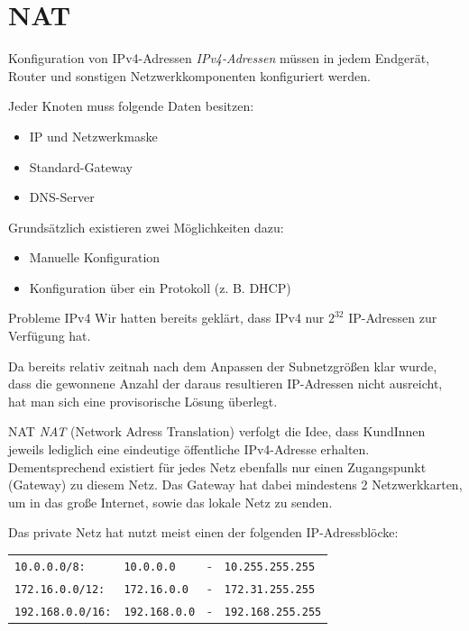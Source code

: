\section{NAT}

\begin{bonus}{Konfiguration von IPv4-Adressen}
    \emph{IPv4-Adressen} müssen in jedem Endgerät, Router und sonstigen Netzwerkkomponenten konfiguriert werden.

    Jeder Knoten muss folgende Daten besitzen:
    \begin{itemize}
        \item IP und Netzwerkmaske
        \item Standard-Gateway
        \item DNS-Server
    \end{itemize}

    Grundsätzlich existieren zwei Möglichkeiten dazu:
    \begin{itemize}
        \item Manuelle Konfiguration
        \item Konfiguration über ein Protokoll (z. B. DHCP)
    \end{itemize}
\end{bonus}

\begin{bonus}{Probleme IPv4}
    Wir hatten bereits geklärt, dass IPv4 nur $2^{32}$ IP-Adressen zur Verfügung hat.

    Da bereits relativ zeitnah nach dem Anpassen der Subnetzgrößen klar wurde, dass die gewonnene Anzahl der daraus resultieren IP-Adressen nicht ausreicht, hat man sich eine provisorische Lösung überlegt.
\end{bonus}

\begin{defi}{NAT}
    \emph{NAT} (Network Adress Translation) verfolgt die Idee, dass KundInnen jeweils lediglich eine eindeutige öffentliche IPv4-Adresse erhalten.
    Dementsprechend existiert für jedes Netz ebenfalls nur einen Zugangspunkt (Gateway) zu diesem Netz.
    Das Gateway hat dabei mindestens 2 Netzwerkkarten, um in das große Internet, sowie das lokale Netz zu senden.

    Das private Netz hat nutzt meist einen der folgenden IP-Adressblöcke:\\
    \begin{tabular}{llcl}
        \texttt{10.0.0.0/8:}     & \texttt{10.0.0.0}    & - & \texttt{10.255.255.255}  \\
        \texttt{172.16.0.0/12:}  & \texttt{172.16.0.0}  & - & \texttt{172.31.255.255}  \\
        \texttt{192.168.0.0/16:} & \texttt{192.168.0.0} & - & \texttt{192.168.255.255}
    \end{tabular}
\end{defi}

